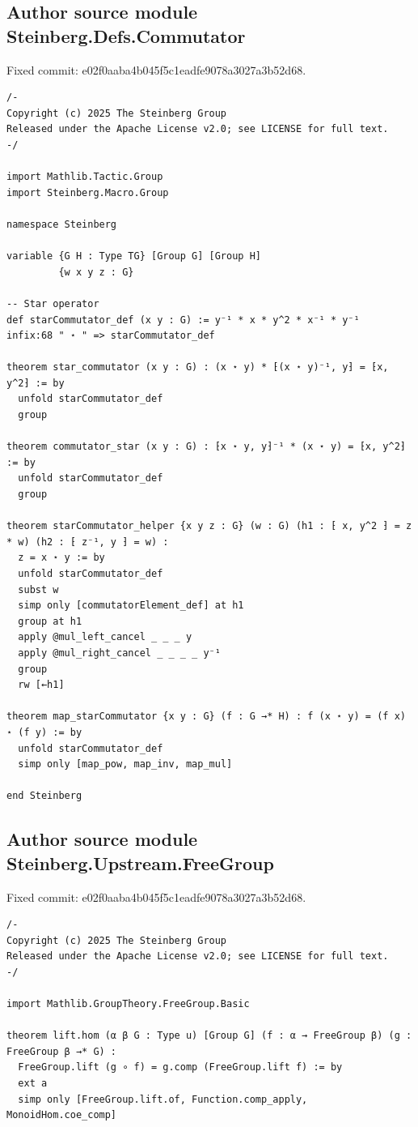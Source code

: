 \documentclass[10pt,a4paper]{article}
\begin{document}
\subsection*{Author source module Steinberg.Defs.Commutator}
\noindent Fixed commit: e02f0aaba4b045f5c1eadfe9078a3027a3b52d68.
\begin{Verbatim}
/-
Copyright (c) 2025 The Steinberg Group
Released under the Apache License v2.0; see LICENSE for full text.
-/

import Mathlib.Tactic.Group
import Steinberg.Macro.Group

namespace Steinberg

variable {G H : Type TG} [Group G] [Group H]
         {w x y z : G}

-- Star operator
def starCommutator_def (x y : G) := y⁻¹ * x * y^2 * x⁻¹ * y⁻¹
infix:68 " ⋆ " => starCommutator_def

theorem star_commutator (x y : G) : (x ⋆ y) * ⁅(x ⋆ y)⁻¹, y⁆ = ⁅x, y^2⁆ := by
  unfold starCommutator_def
  group

theorem commutator_star (x y : G) : ⁅x ⋆ y, y⁆⁻¹ * (x ⋆ y) = ⁅x, y^2⁆ := by
  unfold starCommutator_def
  group

theorem starCommutator_helper {x y z : G} (w : G) (h1 : ⁅ x, y^2 ⁆ = z * w) (h2 : ⁅ z⁻¹, y ⁆ = w) :
  z = x ⋆ y := by
  unfold starCommutator_def
  subst w
  simp only [commutatorElement_def] at h1
  group at h1
  apply @mul_left_cancel _ _ _ y
  apply @mul_right_cancel _ _ _ _ y⁻¹
  group
  rw [←h1]

theorem map_starCommutator {x y : G} (f : G →* H) : f (x ⋆ y) = (f x) ⋆ (f y) := by
  unfold starCommutator_def
  simp only [map_pow, map_inv, map_mul]

end Steinberg
\end{Verbatim}

\subsection*{Author source module Steinberg.Upstream.FreeGroup}
\noindent Fixed commit: e02f0aaba4b045f5c1eadfe9078a3027a3b52d68.
\begin{Verbatim}
/-
Copyright (c) 2025 The Steinberg Group
Released under the Apache License v2.0; see LICENSE for full text.
-/

import Mathlib.GroupTheory.FreeGroup.Basic

theorem lift.hom (α β G : Type u) [Group G] (f : α → FreeGroup β) (g : FreeGroup β →* G) :
  FreeGroup.lift (g ∘ f) = g.comp (FreeGroup.lift f) := by
  ext a
  simp only [FreeGroup.lift.of, Function.comp_apply, MonoidHom.coe_comp]
\end{Verbatim}
\end{document}
